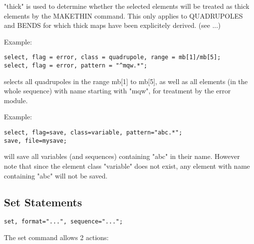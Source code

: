 "thick" is used to determine whether the selected elements will be
treated as thick elements by the MAKETHIN command. This only applies to
QUADRUPOLES and BENDS for which thick maps have been explicitely
derived. (see ...) 

Example: 
\begin{verbatim}
select, flag = error, class = quadrupole, range = mb[1]/mb[5];
select, flag = error, pattern = "^mqw.*";
\end{verbatim} 
selects all quadrupoles in the range mb[1] to mb[5], as well as all
elements (in the whole sequence) with name starting with "mqw", for 
treatment by the error module.  

Example:  
\begin{verbatim}
select, flag=save, class=variable, pattern="abc.*";
save, file=mysave;
\end{verbatim} 
will save all variables (and sequences) containing "abc" in their name.
However note that since the element class "variable" does not exist, any
element with name containing "abc" will not be saved. 


\subsection{Set Statements}
\begin{verbatim}
set, format="...", sequence="...";
\end{verbatim} 

The set command allows 2 actions: 

